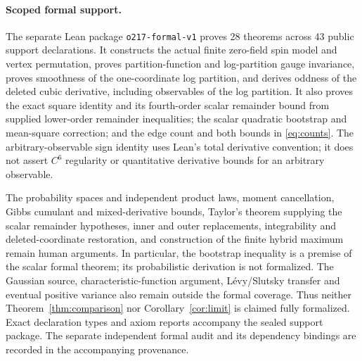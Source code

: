 \paragraph{Scoped formal support.}
The separate Lean package \texttt{o217-formal-v1} proves 28 theorems across 43 public support declarations. It constructs the actual finite zero-field spin model and vertex permutation, proves partition-function and log-partition gauge invariance, proves smoothness of the one-coordinate log partition, and derives oddness of the deleted cubic derivative, including observables of the log partition. It also proves the exact square identity and its fourth-order scalar remainder bound from supplied lower-order remainder inequalities; the scalar quadratic bootstrap and mean-square correction; and the edge count and both bounds in \eqref{eq:counts}. The arbitrary-observable sign identity uses Lean's total derivative convention; it does not assert $C^6$ regularity or quantitative derivative bounds for an arbitrary observable.

The probability spaces and independent product laws, moment cancellation, Gibbs cumulant and mixed-derivative bounds, Taylor's theorem supplying the scalar remainder hypotheses, inner and outer replacements, integrability and deleted-coordinate restoration, and construction of the finite hybrid maximum remain human arguments. In particular, the bootstrap inequality is a premise of the scalar formal theorem; its probabilistic derivation is not formalized. The Gaussian source, characteristic-function argument, L\'evy/Slutsky transfer and eventual positive variance also remain outside the formal coverage. Thus neither Theorem~\ref{thm:comparison} nor Corollary~\ref{cor:limit} is claimed fully formalized. Exact declaration types and axiom reports accompany the sealed support package. The separate independent formal audit and its dependency bindings are recorded in the accompanying provenance.
